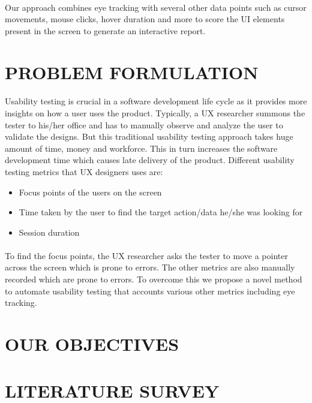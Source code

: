 \documentclass[a4paper,12pt,oneside]{article}
\begin{document}
\paragraph{}
Our approach combines eye tracking with several other data points such as cursor movements, mouse clicks, hover duration and more to score the UI elements present in the screen to generate an interactive report.

\newpage
\section{PROBLEM FORMULATION}
\paragraph{}
Usability testing is crucial in a software development life cycle as it provides more insights on how a user uses the product. Typically, a UX researcher summons the tester to his/her office and has to manually observe and analyze the user to validate the designs. But this traditional usability testing approach takes huge amount of time, money and workforce. This in turn increases the software development time which causes late delivery of the product. 
Different usability testing metrics that UX designers uses are: 
\begin{itemize}
\item Focus points of the users on the screen
\item Time taken by the user to find the target action/data he/she was looking for
\item Session duration
\end{itemize}
\paragraph{}
To find the focus points, the UX researcher asks the tester to move a pointer across the screen which is prone to errors. The other metrics are also manually recorded which are prone to errors. To overcome this we propose a novel method to automate usability testing that accounts various other metrics including eye tracking.

\newpage
\section{OUR OBJECTIVES}



\newpage
\section{LITERATURE SURVEY}
\end{document}

